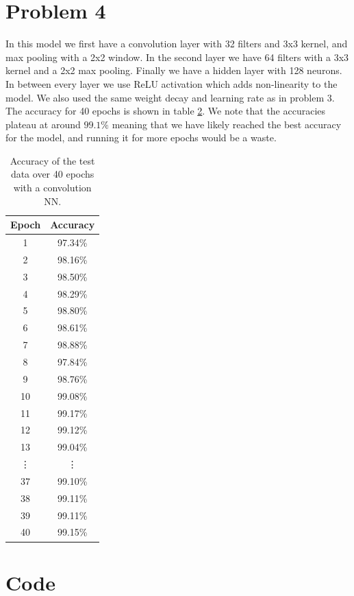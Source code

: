 \documentclass[a4paper]{article}
\begin{document}
\begin{table}[h!]
\section*{Problem 4}
In this model we first have a convolution layer with 32 filters and 3x3 kernel, and max pooling with a 2x2 window.
In the second layer we have 64 filters with a 3x3 kernel and a 2x2 max pooling. Finally we have a hidden layer with 128 neurons. In between every layer we use ReLU activation which adds non-linearity to the model. We also used the same weight decay and learning rate as in problem 3. The accuracy for 40 epochs is shown in table \ref{tab3}. We note that the accuracies plateau at around $99.1\%$ meaning that we have likely reached the best accuracy for the model, and running it for more epochs would be a waste.
\begin{table}[H]
	\centering
	\begin{tabular}{|c|c|}
	\hline
	Epoch & Accuracy \\
	\hline1 & 97.34\% \\
	\hline2 & 98.16\% \\
	\hline3 & 98.50\% \\
	\hline4 & 98.29\% \\
	\hline5 & 98.80\% \\
	\hline6 & 98.61\% \\
	\hline7 & 98.88\% \\
	\hline8 & 97.84\% \\
	\hline9 & 98.76\% \\
	\hline10 & 99.08\%\\
	\hline11 & 99.17\%\\
	\hline12 & 99.12\%\\
	\hline13 & 99.04\%\\
	\hline\vdots & \vdots\\
	\hline37 & 99.10\%\\
	\hline38 & 99.11\%\\
	\hline39 & 99.11\%\\
	\hline40 & 99.15\%\\
	\hline\end{tabular}
	\caption{Accuracy of the test data over 40 epochs with a convolution NN. }
	\label{tab3}
\end{table}

\printbibliography
\appendix

\section*{Code}
\label{app:excode}


\end{table}
\end{document}
